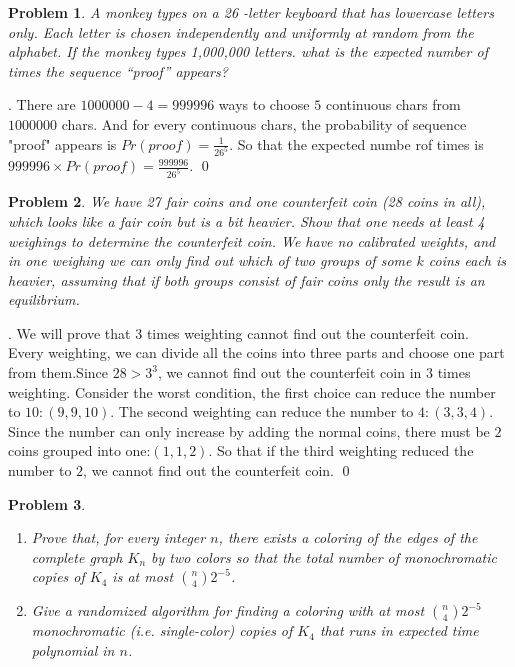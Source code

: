 \documentclass[12pt]{article}
\newtheorem{hw}{Problem}
\newenvironment{sol}
  {\par\vspace{3mm}\noindent{\it Solution}.}
  {\qed}
\begin{document}
\begin{hw}
 A monkey types on a 26 -letter keyboard that has lowercase letters only.
Each letter is chosen independently and uniformly at random from the alphabet. If the
monkey types 1,000,000 letters. what is the expected number of times the sequence
``proof'' appears?
\end{hw}

\begin{sol}
    There are $1000000-4=999996$ ways to choose $5$ continuous chars from $1000000$ chars. And for every continuous chars, the probability of sequence "proof" appears is $Pr(proof)=\frac{1}{26^5}$. So that the expected numbe rof times is $999996\times Pr(proof)=\frac{999996}{26^5}$.
\end{sol}


\begin{hw}
We have 27 fair coins and one counterfeit coin (28 coins in all), which looks like a fair coin but is a bit heavier. Show that one needs at least 4 weighings to determine the counterfeit coin. We have no calibrated weights, and in one weighing we can only find out which of two groups of some $k$ coins each is heavier, assuming that if both groups consist of fair coins only the result is an equilibrium.
\end{hw}

\begin{sol}
    We will prove that $3$ times weighting cannot find out the counterfeit coin.\\
    Every weighting, we can divide all the coins into three parts and choose one part from them.Since $28>3^3$, we cannot find out the counterfeit coin in $3$ times weighting. 
    Consider the worst condition, the first choice can reduce the number to $10:(9,9,10)$. The second weighting can reduce the number to $4:(3,3,4)$. Since the number can only increase by adding the normal coins, there must be $2$ coins grouped into one:$(1,1,2)$. So that if the third weighting reduced the number to $2$, we cannot find out the counterfeit coin.
\end{sol}


\begin{hw}
\begin{enumerate}
  \item Prove that, for every integer $n$, there exists a coloring of the edges of the complete graph $K_n$ by two colors so that the total number of monochromatic copies of $K_4$ is at most ${n\choose 4}2^{-5}$.
  \item Give a randomized algorithm for finding a coloring with at most ${n \choose 4}2^{-5}$ monochromatic (i.e. single-color) copies of $K_4$ that runs in expected time polynomial in $n$.
\end{enumerate}
\end{hw}
\end{document}
